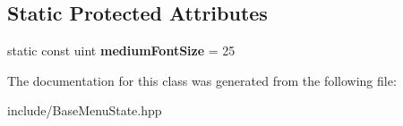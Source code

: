 \subsection*{Static Protected Attributes}
\begin{DoxyCompactItemize}
\item 
\mbox{\label{class_base_menu_state_a003cf33aa9c69fa85db7486f6812b4f6}} 
static const uint {\bfseries medium\+Font\+Size} = 25
\end{DoxyCompactItemize}


The documentation for this class was generated from the following file\+:\begin{DoxyCompactItemize}
\item 
include/Base\+Menu\+State.\+hpp\end{DoxyCompactItemize}
